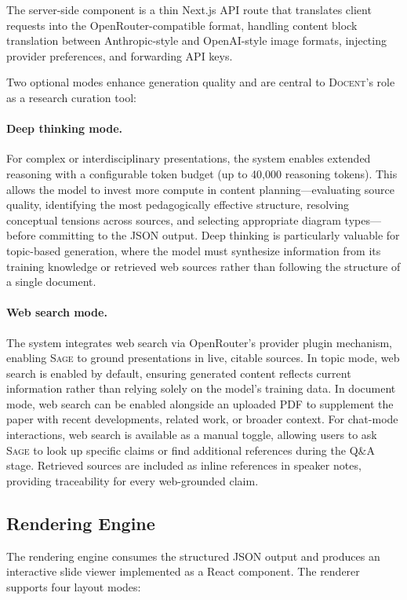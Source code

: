 \documentclass[11pt,a4paper]{article}
\newcommand{\system}{\textsc{Docent}\xspace}
\newcommand{\sage}{\textsc{Sage}\xspace}
\begin{document}
The server-side component is a thin Next.js API route that translates client requests into the OpenRouter-compatible format, handling content block translation between Anthropic-style and OpenAI-style image formats, injecting provider preferences, and forwarding API keys.

Two optional modes enhance generation quality and are central to \system's role as a research curation tool:

\paragraph{Deep thinking mode.}
For complex or interdisciplinary presentations, the system enables extended reasoning with a configurable token budget (up to 40{,}000 reasoning tokens).
This allows the model to invest more compute in content planning---evaluating source quality, identifying the most pedagogically effective structure, resolving conceptual tensions across sources, and selecting appropriate diagram types---before committing to the JSON output.
Deep thinking is particularly valuable for topic-based generation, where the model must synthesize information from its training knowledge or retrieved web sources rather than following the structure of a single document.

\paragraph{Web search mode.}
The system integrates web search via OpenRouter's provider plugin mechanism, enabling \sage to ground presentations in live, citable sources.
In topic mode, web search is enabled by default, ensuring generated content reflects current information rather than relying solely on the model's training data.
In document mode, web search can be enabled alongside an uploaded PDF to supplement the paper with recent developments, related work, or broader context.
For chat-mode interactions, web search is available as a manual toggle, allowing users to ask \sage to look up specific claims or find additional references during the Q\&A stage.
Retrieved sources are included as inline references in speaker notes, providing traceability for every web-grounded claim.

\subsection{Rendering Engine}

The rendering engine consumes the structured JSON output and produces an interactive slide viewer implemented as a React component.
The renderer supports four layout modes:
\end{document}
